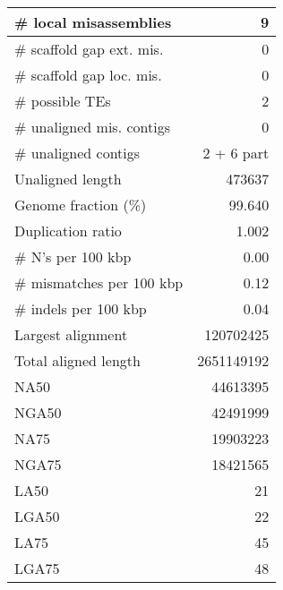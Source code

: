 \documentclass[12pt,a4paper]{article}
\begin{document}
\begin{table}[ht]
\begin{center}
\begin{tabular}{|l*{1}{|r}|}
\# local misassemblies & 9 \\ \hline
\# scaffold gap ext. mis. & 0 \\ \hline
\# scaffold gap loc. mis. & 0 \\ \hline
\# possible TEs & 2 \\ \hline
\# unaligned mis. contigs & 0 \\ \hline
\# unaligned contigs & 2 + 6 part \\ \hline
Unaligned length & 473637 \\ \hline
Genome fraction (\%) & 99.640 \\ \hline
Duplication ratio & 1.002 \\ \hline
\# N's per 100 kbp & 0.00 \\ \hline
\# mismatches per 100 kbp & 0.12 \\ \hline
\# indels per 100 kbp & 0.04 \\ \hline
Largest alignment & 120702425 \\ \hline
Total aligned length & 2651149192 \\ \hline
NA50 & 44613395 \\ \hline
NGA50 & 42491999 \\ \hline
NA75 & 19903223 \\ \hline
NGA75 & 18421565 \\ \hline
LA50 & 21 \\ \hline
LGA50 & 22 \\ \hline
LA75 & 45 \\ \hline
LGA75 & 48 \\ \hline
\end{tabular}
\end{center}
\end{table}
\end{document}
